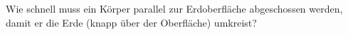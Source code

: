 Wie schnell muss ein Körper parallel zur Erdoberfläche abgeschossen werden, damit er die Erde (knapp über der Oberfläche) umkreist?
